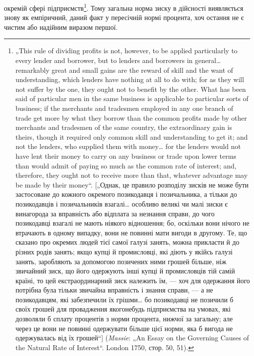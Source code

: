 \parcont{}  %
окремій сфері підприємств\footnote{
„This rule of dividing profits is not, however, to be applied particularly to
every lender and borrower, but to lenders and borrowers in general\dots{} remarkably
great and small gains are the reward of skill and the want of understanding, which
lenders have nothing at all to do with; for as they will not suffer by the one,
they ought not to benefit by the other. What has been said of particular men in
the same business is applicable to particular sorts of business; if the merchants
and tradesmen employed in any one branch of trade get more by what they borrow
than the common profits made by other merchants and tradesmen of the same
country, the extraordinary gain is theirs, though it required only common skill
and understanding to get it; and not the lenders, who supplied them with money\dots{}
for the lenders would not have lent their money to carry on any business or trade
upon lower terms than would admit of paying so much as the common rate of
interest; and, therefore, they ought not to receive more than that, whatever advantage
may be made by their money“. [„Однак, це правило розподілу зисків не
може бути застосоване до кожного окремого позикодавця і позичальника, а
тільки до позикодавців і позичальників взагалі\dots{} особливо великі чи малі зиски
є винагорода за вправність або відплата за незнання справи, до чого позикодавці
взагалі не мають ніякого відношення; бо, оскільки вони нічого не втрачають
в одному випадку, вони не повинні мати вигоди в другому. Те, що сказано
про окремих людей тієї самої галузі занять, можна прикласти й до різних
родів занять; якщо купці й промисловці, які діють у якійсь галузі занять, заробляють
за допомогою позичених ними грошей більше, ніж звичайний зиск,
що його одержують інші купці й промисловців тій самій країні, то цей екстраординарний
зиск належить їм, — хоч для одержання його потрібна була тільки
звичайна вправність і знання справи, — а не позикодавцям, які забезпечили
їх грішми\dots{} бо позикодавці не позичили б своїх грошей для провадження якогонебудь
підприємства на умовах, які дозволяли б сплату процентів з норми
процента, нижчої за загальну; але через це вони не повинні одержувати більше
цієї норми, яка б вигода не одержувалась від їх грошей“] (\emph{Massie}: „An
Essay on the Governing Causes of the Natural Rate of Interest“. London 1750,
стор. 50, 51).
}. Тому загальна норма зиску в дійсності
виявляється знову як емпіричний, даний факт у пересічній
нормі процента, хоч остання не є чистим або надійним виразом
першої.

